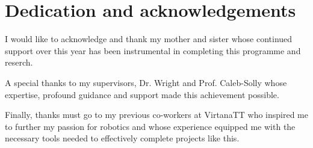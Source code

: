 %
%

\chapter*{Dedication and acknowledgements}
\begin{SingleSpace}
    I would like to acknowledge and thank my mother and sister whose continued support over this year has been instrumental in completing this programme and reserch.

    A special thanks to my supervisors, Dr. Wright and Prof. Caleb-Solly whose expertise, profound guidance and support made this achievement possible.

    Finally, thanks must go to my previous co-workers at VirtanaTT who inspired me to further my passion for robotics and whose experience equipped me with the necessary tools needed to effectively complete projects like this.
\end{SingleSpace}
\clearpage